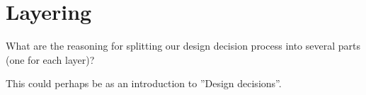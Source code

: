 \section{Layering}
What are the reasoning for splitting our design decision process into several parts (one for each layer)?

This could perhaps be as an introduction to ''Design decisions''.